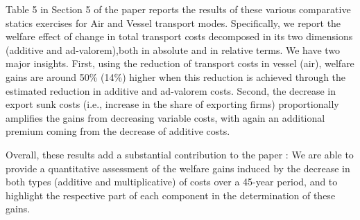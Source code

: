 \documentclass[a4paper,11pt]{article}
\begin{document}
Table 5 in Section 5 of the paper reports the results of these various comparative statics exercises for Air and Vessel transport modes. Specifically, we report the welfare effect of change in total transport costs decomposed in its two dimensions (additive and ad-valorem),both in absolute and in relative terms. We have two major insights. First, using the reduction of transport costs in vessel (air),  welfare gains are around 50\% (14\%) higher when this reduction is achieved through the estimated reduction in additive and ad-valorem costs. Second, the decrease in export sunk costs (i.e., increase in the share of exporting firms) proportionally amplifies the gains from decreasing variable costs, with again an additional premium coming from the decrease of additive costs.

Overall, these results add a substantial contribution to the paper : We are able to provide a quantitative assessment of the welfare gains induced by the decrease in both types (additive and multiplicative) of costs over a 45-year period, and to highlight the respective part of each component in the determination of these gains.







\end{document}
